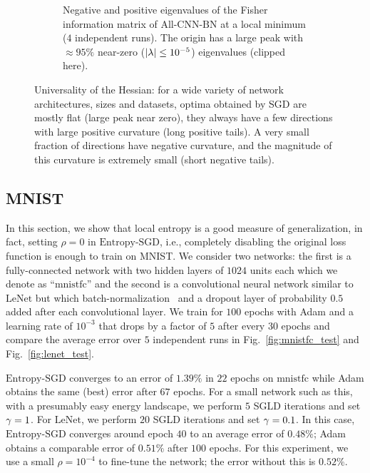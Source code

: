 \documentclass[10pt]{article}
\newcommand{\entropysgd}{\mathrm{Entropy}\textrm{-}\mathrm{SGD}}
\newcommand{\mnistfc}{\textrm{mnistfc}}
\newcommand{\lenet}{\textrm{LeNet}}
\newcommand{\allcnn}{\textrm{All-CNN-BN}}
\begin{document}
\begin{figure}[!tbh]
\begin{subfigure}[b]{\textwidth}
\begin{subfigure}[b]{0.47 \textwidth}
        \end{subfigure}
    \caption{\small Negative and positive eigenvalues of the Fisher information matrix of $\allcnn$ at a local minimum ($4$ independent runs). The origin has a large peak with $\approx 95\%$ near-zero ($\left| \lambda \right| \leq 10^{-5}$) eigenvalues (clipped here).}
    \label{fig:allcnn_hessian}
    \end{subfigure}
\caption{\small Universality of the Hessian: for a wide variety of network architectures, sizes and datasets, optima obtained by SGD are mostly flat (large peak near zero), they always have a few directions with large positive curvature (long positive tails). A very small fraction of directions have negative curvature, and the magnitude of this curvature is extremely small (short negative tails).}
\label{fig:universality}
\end{figure}

\subsection{MNIST}
\label{ss:expt:mnist}

In this section, we show that local entropy is a good measure of generalization, in fact, setting $\rho = 0$ in $\entropysgd$, i.e., completely disabling the original loss function is enough to train on MNIST. We consider two networks: the first is a fully-connected network with two hidden layers of $1024$ units each which we denote as ``$\mnistfc$'' and the second is a convolutional neural network similar to $\lenet$ but which batch-normalization~\citep{ioffe2015batch} and a dropout layer of probability $0.5$ added after each convolutional layer. We train for $100$ epochs with Adam and a learning rate of $10^{-3}$ that drops by a factor of $5$ after every $30$ epochs and compare the average error over $5$ independent runs in Fig.~\ref{fig:mnistfc_test} and Fig.~\ref{fig:lenet_test}.

$\entropysgd$ converges to an error of $1.39\%$ in $22$ epochs on $\mnistfc$ while Adam obtains the same (best) error after $67$ epochs. For a small network such as this, with a presumably easy energy landscape, we perform $5$ SGLD iterations and set $\gamma = 1$. For $\lenet$, we perform $20$ SGLD iterations and set $\gamma = 0.1$. In this case, $\entropysgd$ converges around epoch $40$ to an average error of $0.48\%$; Adam obtains a comparable error of $0.51\%$ after $100$ epochs. For this experiment, we use a small $\rho = 10^{-4}$ to fine-tune the network; the error without this is $0.52\%$.
\end{document}
